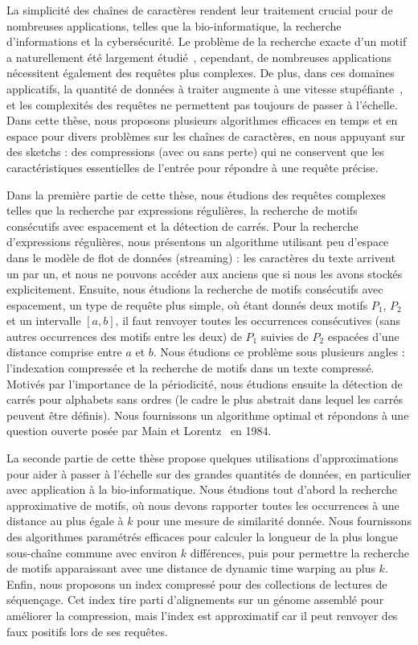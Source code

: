La simplicité des chaînes de caractères rendent leur traitement crucial pour de nombreuses applications, telles que la bio-informatique, la recherche d'informations et la cybersécurité.
Le problème de la recherche exacte d'un motif a naturellement été largement étudié~\cite{Charras2004}, cependant, de nombreuses applications nécessitent également des requêtes plus complexes. De plus, dans ces domaines applicatifs, la quantité de données à traiter augmente à une vitesse stupéfiante~\cite{muir2016real}, et les complexités des requêtes ne permettent pas toujours de passer à l'échelle.
Dans cette thèse, nous proposons plusieurs algorithmes efficaces en temps et en espace pour divers problèmes sur les chaînes de caractères, en nous appuyant sur des \og{}sketchs\fg{} : des compressions (avec ou sans perte) qui ne conservent que les caractéristiques essentielles de l'entrée pour répondre à une requête précise.

Dans la première partie de cette thèse, nous étudions des requêtes complexes telles que la recherche par expressions régulières, la recherche de motifs consécutifs avec espacement et la détection de carrés.
Pour la recherche d'expressions régulières, nous présentons un algorithme utilisant peu d'espace dans le modèle de flot de données (\og{}streaming\fg{}) : les caractères du texte arrivent un par un, et nous ne pouvons accéder aux anciens que si nous les avons stockés explicitement.
Ensuite, nous étudions la recherche de motifs consécutifs avec espacement, un type de requête plus simple, où étant donnés deux motifs $P_1$, $P_2$ et un intervalle $[a, b]$, il faut renvoyer toutes les occurrences consécutives (sans autres occurrences des motifs entre les deux) de $P_1$ suivies  de $P_2$ espacées d'une distance comprise entre $a$ et $b$. Nous étudions ce problème sous plusieurs angles : l'indexation compressée et la recherche de motifs dans un texte compressé.
Motivés par l'importance de la périodicité, nous étudions ensuite la détection de carrés pour alphabets sans ordres (le cadre le plus abstrait dans lequel les carrés peuvent être définis). Nous fournissons un algorithme optimal et répondons à une question ouverte posée par Main et Lorentz~\cite{Main1984} en 1984.

La seconde partie de cette thèse propose quelques utilisations d'approximations pour aider à passer à l'échelle sur des grandes quantités de données, en particulier avec application à la bio-informatique.
%
Nous étudions tout d'abord la recherche approximative de motifs, où nous devons rapporter toutes les occurrences à une distance au plus égale à $k$ pour une mesure de similarité donnée.
Nous fournissons des algorithmes paramétrés efficaces pour calculer la longueur de la plus longue sous-chaîne commune avec environ $k$ différences, puis pour permettre la recherche de motifs apparaissant avec une distance de \og{}dynamic time warping\fg{} au plus $k$.
Enfin, nous proposons un index compressé pour des collections de lectures de séquençage. Cet index tire parti d'alignements sur un génome assemblé pour améliorer la compression, mais l'index est approximatif car il peut renvoyer des faux positifs lors de ses requêtes.